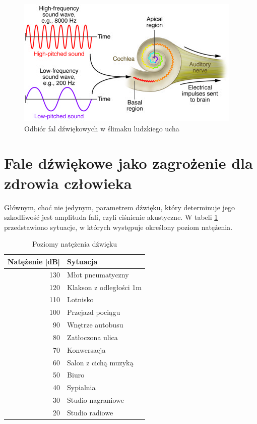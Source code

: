 \begin{figure}[H]
	\centering
	\includegraphics{zdjecia/slimak.png}
	\caption{\label{slimak} Odbiór fal dźwiękowych w ślimaku ludzkiego ucha\cite{cochlea}}
\end{figure}


\section{Fale dźwiękowe jako zagrożenie dla zdrowia człowieka}

Głównym, choć nie jedynym, parametrem dźwięku, który determinuje jego szkodliwość jest amplituda fali, czyli ciśnienie akustyczne. W tabeli \ref{tab:SPL} przedstawiono sytuacje, w których występuje określony poziom natężenia.

\begin{table}[H]
	\centering
	\begin{tabular}{|r|l|}
		\hline
		Natężenie [dB] & Sytuacja \\
		\hline
		\hline
		\rowcolor{red!50}
		130 & Młot pneumatyczny \\
		\hline
		\rowcolor{red!40}
		120 & Klakson z odległości 1m \\
		\hline
		\rowcolor{red!30}
		110 & Lotnisko \\
		\hline
		\rowcolor{red!20}
		100 & Przejazd pociągu \\
		\hline
		\rowcolor{orange!20}
		90 & Wnętrze autobusu \\
		\hline
		\rowcolor{yellow!20}
		80 & Zatłoczona ulica \\
		\hline
		\rowcolor{green!30}
		70 & Konwersacja \\
		\hline
		\rowcolor{green!30}
		60 & Salon z cichą muzyką \\
		\hline
		\rowcolor{green!30}
		50 & Biuro \\
		\hline
		\rowcolor{green!30}
		40 & Sypialnia \\
		\hline
		\rowcolor{green!30}
		30 & Studio nagraniowe \\
		\hline
		\rowcolor{green!30}
		20 & Studio radiowe \\
		\hline
	\end{tabular}
	\caption{Poziomy natężenia dźwięku\cite{SPLtable}}
	\label{tab:SPL}
\end{table}

